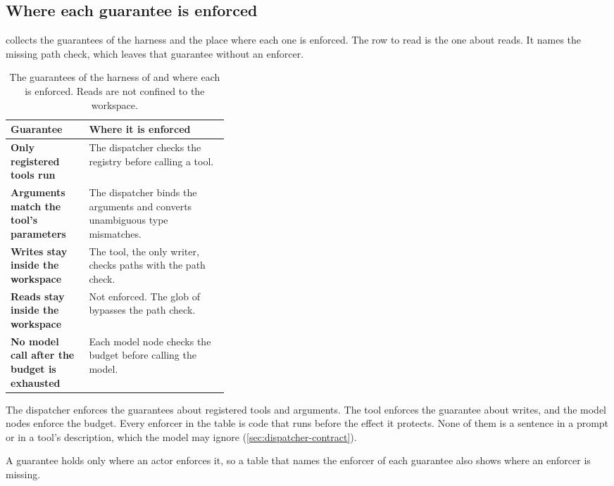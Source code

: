 \subsection{Where each guarantee is enforced}
\label{sec:dispatcher-guarantees}

 collects the guarantees of the harness and the place where each
one is enforced. The row to read is the one about reads. It names the missing path check, which
leaves that guarantee without an enforcer.

\begin{table}[htbp]
  \caption{The guarantees of the harness of \msa{} and where each is enforced. Reads are not
  confined to the workspace.}
  \label{tab:dispatcher-guarantees}
  \begin{adjustbox}{width=\linewidth}\begin{tabularx}{\linewidth}{@{}L{0.36\linewidth}X@{}}
    \toprule
    \textbf{Guarantee} & \textbf{Where it is enforced} \\
    \midrule
    \textbf{Only registered tools run} & The dispatcher checks the registry before calling a tool. \\
    \textbf{Arguments match the tool's parameters} & The dispatcher binds the arguments and converts
      unambiguous type mismatches. \\
    \textbf{Writes stay inside the workspace} & The  tool, the only writer, checks
      paths with the path check. \\
    \textbf{Reads stay inside the workspace} & Not enforced. The glob of  bypasses
      the path check. \\
    \textbf{No model call after the budget is exhausted} & Each model node checks the budget before
      calling the model. \\
    \bottomrule
  \end{tabularx}\end{adjustbox}
\end{table}

The dispatcher enforces the guarantees about registered tools and arguments. The 
tool enforces the guarantee about writes, and the model nodes enforce the budget. Every enforcer in
the table is code that runs before the effect it protects. None of them is a sentence in a prompt or
in a tool's description, which the model may ignore (\cref{sec:dispatcher-contract}).

A guarantee holds only where an actor enforces it, so a table that names the enforcer of each
guarantee also shows where an enforcer is missing.

